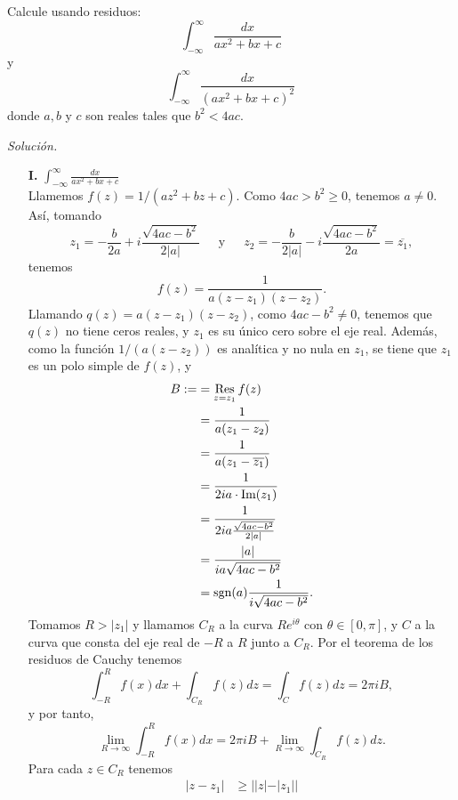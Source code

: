 \begin{Ejc}
   Calcule usando residuos:
   $$
   \int_{-\infty}^{\infty}\frac{dx}{ax^2+bx+c} 
   $$
   y
   $$
   \int_{-\infty}^{\infty}\frac{dx}{\left( ax^2+bx+c\right)^2}
   $$
   donde $a, b$ y $c$ son reales tales que $b^2<4ac$.
\end{Ejc}
\textit{Solución.}{
   \begin{itemize}
      \item[\textbf{I.}]$\int_{-\infty}^{\infty}\frac{dx}{ax^2+bx+c}$\\
         Llamemos $f(z)=1/(az^2+bz+c)$. Como $4ac>b^2\geq0$, tenemos $a\neq 0$. Así, tomando
         $$
         z_1=-\frac{b}{2a}+i\frac{\sqrt{4ac-b^2}}{2|a|}\phantom{000}\text{y}\phantom{000}z_2=-\frac{b}{2|a|}-i\frac{\sqrt{4ac-b^2}}{2a}=\overline{z_1},
         $$
         tenemos
         $$
         f(z)=\frac{1}{a(z-z_1)(z-z_2)}.
         $$
         Llamando $q(z)=a(z-z_1)(z-z_2)$, como $4ac-b^2\neq 0$, tenemos que $q(z)$ no tiene ceros reales, y $z_1$ es su único cero sobre el eje real. Además, como la función $1/(a(z-z_2))$ es analítica y no nula en $z_1$, se tiene que $z_1$ es un polo simple de $f(z)$, y
         $$
         \begin{aligned}
            B:=&=\mathop{\mathrm{Res}}\limits_{z=z_1}f(z)\\
               &=\frac{1}{a(z_1-z_2)}\\
               &=\frac{1}{a(z_1-\overline{z_1})}\\
               &=\frac{1}{2ia\cdot\text{Im}(z_1)}\\
               &=\frac{1}{2ia\frac{\sqrt{4ac-b^2}}{2|a|}}\\
               &=\frac{|a|}{ia\sqrt{4ac-b^2}}\\
               &=\sgn(a)\frac{1}{i\sqrt{4ac-b^2}}.
         \end{aligned}
         $$
         Tomamos $R>|z_1|$ y llamamos $C_R$ a la curva $Re^{i\theta}$ con $\theta\in[0,\pi]$, y $C$ a la curva que consta del eje real de $-R$ a $R$ junto a $C_R$. Por el teorema de los residuos de Cauchy tenemos
         $$
         \int_{-R}^{R}f(x)dx+\int_{C_R}f(z)dz=\int_{C}f(z)dz=2\pi i B,
         $$
         y por tanto,
         $$
         \lim_{R\to\infty}\int_{-R}^{R}f(x)dx=2\pi i B + \lim_{R\to\infty}\int_{C_R}f(z)dz.
         $$
         Para cada $z\in C_R$ tenemos
         $$
         \begin{aligned}
            |z-z_1|&\geq ||z|-|z_1||\\

\end{aligned}$$
\end{itemize}}
